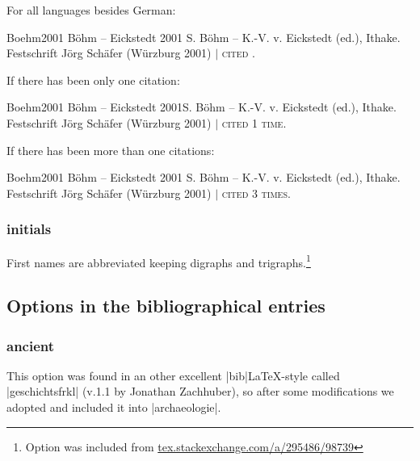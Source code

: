 \documentclass[a4paper,
10pt,
greek,
french,
spanish,
italian,
ngerman,
english
]{ltxdoc}
\begin{document}
For all languages besides German:
\begin{bibbsp}{Boehm2001}
Böhm – Eickstedt 2001 \hspace{3em}  S. Böhm – K.-V. v. Eickstedt (ed.), Ithake. Festschrift Jörg Schäfer (Würzburg 2001) $\vert$  {\scshape cited {{\color{red}{not once}}}.}
 \end{bibbsp}
  
 If there has been only one citation:
\begin{bibbsp}{Boehm2001}
Böhm – Eickstedt 2001\hspace{3em}S. Böhm – K.-V. v. Eickstedt (ed.), Ithake. Festschrift Jörg Schäfer (Würzburg 2001) $\vert$  {\scshape cited 1 time.}
 \end{bibbsp}

 If there has been more than one citations:
\begin{bibbsp}{Boehm2001}
Böhm – Eickstedt 2001\hspace{3em} S. Böhm – K.-V. v. Eickstedt (ed.), Ithake. Festschrift Jörg Schäfer (Würzburg 2001) $\vert$  {\scshape cited 3 times.}
\end{bibbsp}
 
 \subsubsection{initials}\label{initials}
 First names are abbreviated  keeping digraphs and trigraphs.\footnote{Option was included from \href{http://tex.stackexchange.com/a/295486/98739}{tex.stackexchange.com/a/295486/98739}}


\subsection{Options in the bibliographical entries}\label{optionen-literatur}
\subsubsection{ancient}\label{ancient}
This option was found in an other excellent |bib|\LaTeX-style called  |geschichtsfrkl| (v.1.1 by Jonathan Zachhuber), so after some modifications we adopted and included it into |archaeologie|.
 
\end{document}
